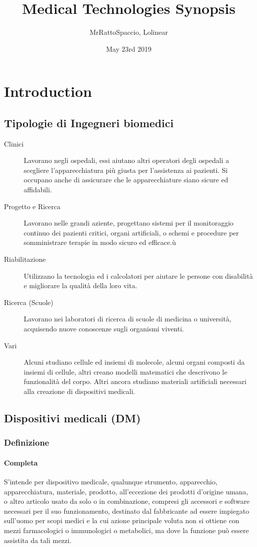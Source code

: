 \documentclass[a4paper]{article}
\title{\Huge Medical Technologies Synopsis \vspace{1cm}}
\author{MrRattoSpaccio, Lolinear}
\date{May 23rd 2019}
\begin{document}
\maketitle
\thispagestyle{empty}
\pagebreak
\tableofcontents
\pagebreak
\section{Introduction}
\subsection{Tipologie di Ingegneri biomedici}
\begin{description}
    \item[Clinici] Lavorano negli ospedali, essi aiutano altri operatori degli
    ospedali a scegliere l'apparecchiatura più giusta per l'assistenza ai 
    pazienti. Si occupano anche di assicurare che le apparecchiature siano
    sicure ed affidabili.
    \item[Progetto e Ricerca] Lavorano nelle grandi aziente, progettano sistemi
    per il monitoraggio continuo dei pazienti critici, organi artificiali, o 
    schemi e procedure per somministrare terapie in modo sicuro ed efficace.ù
    \item[Riabilitazione] Utilizzano la tecnologia ed i calcolatori per 
    aiutare le persone con disabilità e migliorare la qualità della loro vita.
    \item[Ricerca (Scuole)] Lavorano nei laboratori di ricerca di scuole di 
    medicina o università, acquisendo nuove conoscenze sugli organismi viventi.
    \item[Vari] Alcuni studiano cellule ed insiemi di molecole, alcuni organi
    composti da insiemi di cellule, altri creano modelli matematici che 
    descrivono le funzionalità del corpo. Altri ancora studiano materiali
    artificiali necessari alla creazione di dispositivi medicali. 
\end{description}
\subsection{Dispositivi medicali (DM)}
\subsubsection{Definizione}
\paragraph{Completa}
S’intende per dispositivo medicale, qualunque strumento, apparecchio, 
apparecchiatura, materiale, prodotto, all’eccezione dei prodotti d’origine 
umana, o altro articolo usato da solo o in combinazione, compresi gli accessori
e software necessari per il suo funzionamento, destinato dal fabbricante ad 
essere impiegato sull'uomo per scopi medici e la cui azione principale voluta 
non si ottiene con mezzi farmacologici o immunologici o metabolici, ma dove 
la funzione può essere assistita da tali mezzi.
\end{document}
